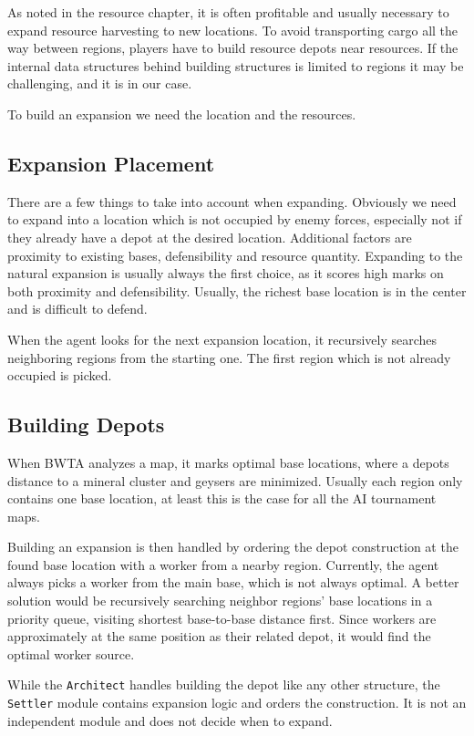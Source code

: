 As noted in the resource chapter, it is often profitable and usually necessary to expand resource harvesting to new locations. To avoid transporting cargo all the way between regions, players have to build resource depots near resources. If the internal data structures behind building structures is limited to regions it may be challenging, and it is in our case.

To build an expansion we need the location and the resources.

	\subsection*{Expansion Placement}
	There are a few things to take into account when expanding. Obviously we need to expand into a location which is not occupied by enemy forces, especially not if they already have a depot at the desired location. Additional factors are proximity to existing bases, defensibility and resource quantity. Expanding to the natural expansion is usually always the first choice, as it scores high marks on both proximity and defensibility. Usually, the richest base location is in the center and is difficult to defend.
	
	When the agent looks for the next expansion location, it recursively searches neighboring regions from the starting one. The first region which is not already occupied is picked.
	
	\subsection*{Building Depots}
	When BWTA analyzes a map, it marks optimal base locations, where a depots distance to a mineral cluster and geysers are minimized. Usually each region only contains one base location, at least this is the case for all the AI tournament maps.
	
	Building an expansion is then handled by ordering the depot construction at the found base location with a worker from a nearby region. Currently, the agent always picks a worker from the main base, which is not always optimal. A better solution would be recursively searching neighbor regions' base locations in a priority queue, visiting shortest base-to-base distance first. Since workers are approximately at the same position as their related depot, it would find the optimal worker source.

	While the \texttt{Architect} handles building the depot like any other structure, the \texttt{Settler} module contains expansion logic and orders the construction. It is not an independent module and does not decide when to expand.
